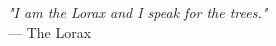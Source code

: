 \begin{flushright}
\emph{"I am the Lorax and I speak for the trees."}\\
 — The Lorax
\end{flushright}
